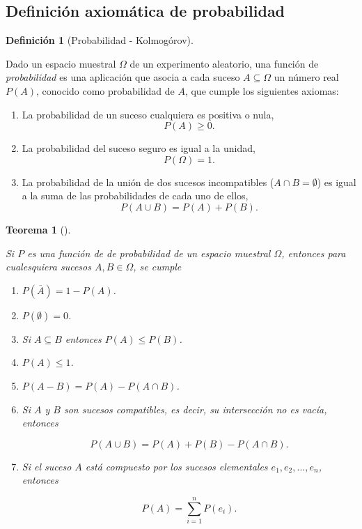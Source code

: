 \documentclass[
  a4paper,
]{scrreport}
\providecommand{\tightlist}{%
  \setlength{\itemsep}{0pt}\setlength{\parskip}{0pt}}\usepackage{longtable,booktabs,array}
\theoremstyle{plain}
\newtheorem{theorem}{Teorema}[chapter]
\theoremstyle{definition}
\theoremstyle{definition}
\newtheorem{definition}{Definición}[chapter]
\theoremstyle{remark}
\begin{document}
\subsection{Definición axiomática de
probabilidad}\label{definiciuxf3n-axiomuxe1tica-de-probabilidad}

\begin{definition}[Probabilidad -
Kolmogórov]\protect\hypertarget{def-probabilidad-kolmogorov}{}\label{def-probabilidad-kolmogorov}

Dado un espacio muestral \(\Omega\) de un experimento aleatorio, una
función de \emph{probabilidad} es una aplicación que asocia a cada
suceso \(A\subseteq \Omega\) un número real \(P(A)\), conocido como
probabilidad de \(A\), que cumple los siguientes axiomas:

\begin{enumerate}
\def\labelenumi{\arabic{enumi}.}
\tightlist
\item
  La probabilidad de un suceso cualquiera es positiva o nula,
  \[P(A)\geq 0.\]
\item
  La probabilidad del suceso seguro es igual a la unidad,
  \[P(\Omega)=1.\]
\item
  La probabilidad de la unión de dos sucesos incompatibles
  (\(A\cap B=\emptyset\)) es igual a la suma de las probabilidades de
  cada uno de ellos, \[P(A\cup B) = P(A)+P(B).\]
\end{enumerate}

\end{definition}

\begin{theorem}[]\protect\hypertarget{thm-consecuencias-axiomas-probabilidad}{}\label{thm-consecuencias-axiomas-probabilidad}

Si \(P\) es una función de de probabilidad de un espacio muestral
\(\Omega\), entonces para cualesquiera sucesos \(A, B\in \Omega\), se
cumple

\begin{enumerate}
\def\labelenumi{\arabic{enumi}.}
\item
  \(P(\overline A) = 1-P(A)\).
\item
  \(P(\emptyset)= 0\).
\item
  Si \(A\subseteq B\) entonces \(P(A)\leq P(B)\).
\item
  \(P(A) \leq 1\).
\item
  \(P(A-B) = P(A)-P(A\cap B)\).
\item
  Si \(A\) y \(B\) son sucesos compatibles, es decir, su intersección no
  es vacía, entonces

  \[P(A\cup B)= P(A) + P(B) - P(A\cap B).\]
\item
  Si el suceso \(A\) está compuesto por los sucesos elementales
  \(e_1,e_2,...,e_n\), entonces

  \[P(A)=\sum_{i=1}^n P(e_i).\]
\end{enumerate}

\end{theorem}
\end{document}
